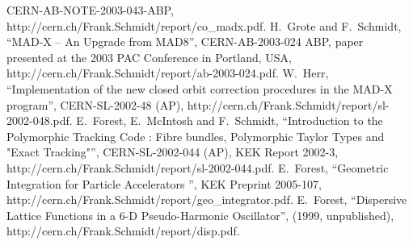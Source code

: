 \documentclass[12pt]{article} \textwidth 17cm \hoffset -2cm
\begin{document}
\begin{thebibliography}{99}
CERN-AB-NOTE-2003-043-ABP,
  {http://cern.ch/Frank.Schmidt/report/co\_madx.pdf}.
%
 H.~Grote and F.~Schmidt, ``MAD-X -- An Upgrade from
  MAD8'', CERN-AB-2003-024 ABP, paper presented at the 2003 PAC
  Conference in Portland, USA,
  {http://cern.ch/Frank.Schmidt/report/ab-2003-024.pdf}.
%
 W.~Herr, ``Implementation of the new closed orbit
  correction procedures in the MAD-X program'',
CERN-SL-2002-48 (AP),
  {http://cern.ch/Frank.Schmidt/report/sl-2002-048.pdf}.
%
 E.~Forest, E.~McIntosh and F.~Schmidt, ``Introduction
  to the Polymorphic Tracking Code : Fibre bundles, Polymorphic Taylor
  Types and "Exact Tracking"'', CERN-SL-2002-044 (AP), KEK Report
  2002-3,
  {http://cern.ch/Frank.Schmidt/report/sl-2002-044.pdf}.
%
 E.~Forest, ``Geometric Integration for Particle Accelerators
'', KEK Preprint 2005-107,
  {http://cern.ch/Frank.Schmidt/report/geo\_integrator.pdf}.
%
 E.~Forest, ``Dispersive Lattice Functions in a 6-D
  Pseudo-Harmonic Oscillator'', (1999, unpublished),
  {http://cern.ch/Frank.Schmidt/report/disp.pdf}.
%
\end{thebibliography}
%
\end{document}
